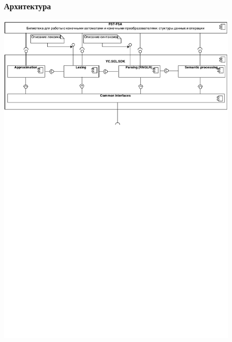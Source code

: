 \documentclass{beamer}
\begin{document}
\begin{frame}
    \transwipe[direction=90]
    \frametitle{Архитектура}
    \includegraphics[width=345pt]{pictures/Components.pdf}
\end{frame}
\end{document}
